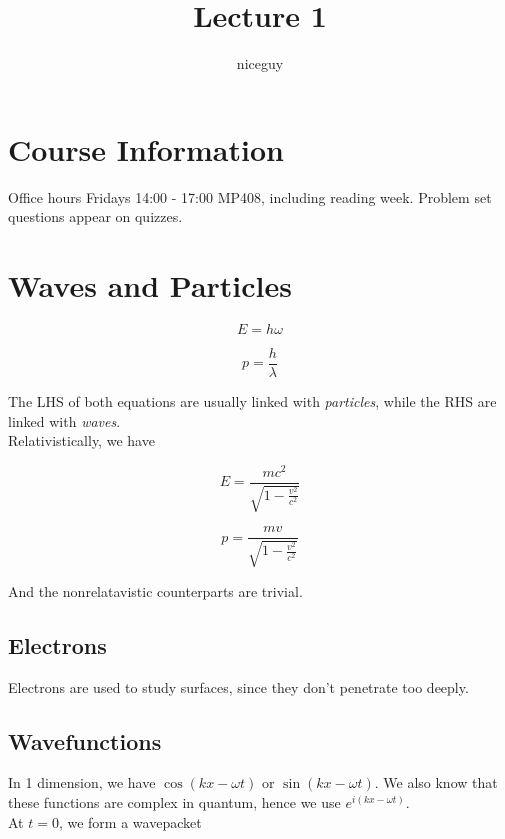 \documentclass[12pt]{article}
\title{Lecture 1}
\author{niceguy}
\begin{document}
\maketitle

\section{Course Information}

Office hours Fridays 14:00 - 17:00 MP408, including reading week. Problem set questions appear on quizzes.

\section{Waves and Particles}

\begin{equation}
    E = h\omega
\end{equation}

\begin{equation}
    p = \frac{h}{\lambda}
\end{equation}

The LHS of both equations are usually linked with \emph{particles}, while the RHS are linked with \emph{waves}. \\
Relativistically, we have

\begin{equation}
    E = \frac{mc^2}{\sqrt{1 - \frac{v^2}{c^2}}}
\end{equation}

\begin{equation}
    p = \frac{mv}{\sqrt{1 - \frac{v^2}{c^2}}}
\end{equation}

And the nonrelatavistic counterparts are trivial.

\subsection{Electrons}
Electrons are used to study surfaces, since they don't penetrate too deeply.

\subsection{Wavefunctions}
In 1 dimension, we have $\cos(kx - \omega t)$ or $\sin(kx - \omega t)$. We also know that these functions are complex in quantum, hence we use $e^{i(kx - \omega t)}$. \\
At $t=0$, we form a wavepacket
\end{document}

